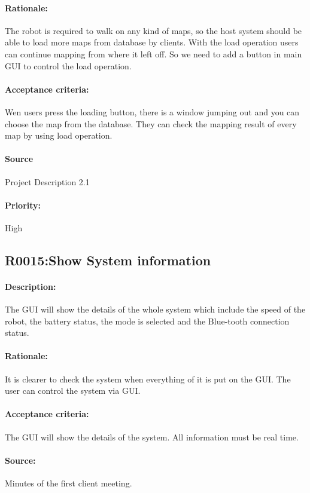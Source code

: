 \documentclass[11pt, a4paper]{report}
\begin{document}
\paragraph{Rationale:}
The robot is required to walk on any kind of maps, so the host system should be able to load more maps from database by clients. With the load operation users can continue mapping from where it left off.  So we need to add a button in main GUI to control the load operation.
\paragraph{Acceptance criteria:}
Wen users press the loading button, there is a window jumping out and you can choose the map from the database. They can check the mapping result of every map by using load operation.
\paragraph{Source}
 Project Description 2.1
\paragraph{Priority:}
High


\subsection{R0015:Show System information}
\paragraph{Description:}
The GUI will show the details of the whole system which include the speed of the robot, the battery status, the mode is selected and the Blue-tooth connection status.
\paragraph{Rationale:}
It is clearer to check the system when everything of it is put on the GUI. The user can control the system via GUI.
\paragraph{Acceptance criteria:}
The GUI will show the details of the system. All information must be real time.
\paragraph{Source:}
Minutes of the first client meeting.
\end{document}
